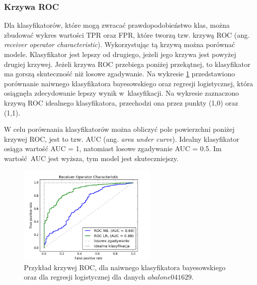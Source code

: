 \subsubsection{Krzywa ROC}
Dla klasyfikatorów, które mogą zwracać prawdopodobieństwo klas, można zbudować wykres wartości TPR oraz FPR, które tworzą tzw. krzywą ROC (ang. \textit{receiver operator characteristic}). Wykorzystując tą krzywą można porównać modele. Klasyfikator jest lepszy od drugiego, jeżeli jego krzywa jest powyżej drugiej krzywej. Jeżeli krzywa ROC przebiega poniżej przekątnej, to klasyfikator ma gorszą skuteczność niż losowe zgadywanie. Na wykresie \ref{fig:krzywa_roc} przedstawiono porównanie naiwnego klasyfikatora bayesowskiego oraz regresji logistycznej, która osiągnęła zdecydowanie lepszy wynik w~klasyfikacji. Na wykresie zaznaczono krzywą ROC idealnego klasyfikatora, przechodzi ona przez punkty (1,0) oraz (1,1).\par
W celu porównania klasyfikatorów można obliczyć pole powierzchni poniżej krzywej ROC, jest to tzw. AUC (ang. \textit{area under curve}). Idealny klasyfikator osiąga wartość AUC = 1, natomiast losowe zgadywanie AUC = 0.5. Im wartość AUC jest wyższa, tym model jest skuteczniejszy.
\begin{figure}[h]
	\centering
	\includegraphics[width=0.6\textwidth]{./images/roc.png}
	\caption[Przykład krzywej ROC]{Przykład krzywej ROC, dla naiwnego klasyfikatora bayesowskiego oraz dla regresji logistycznej dla danych $abalone041629$.}
	\label{fig:krzywa_roc}
\end{figure}
